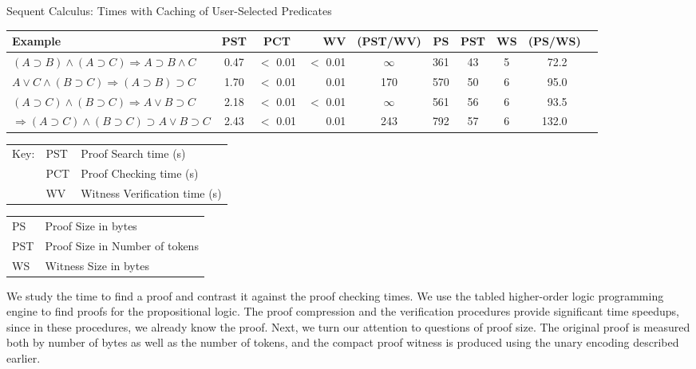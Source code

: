 \documentclass{llncs}
\begin{document}
\begin{center}
Sequent Calculus: Times with Caching of User-Selected Predicates
\begin{small}
\begin{tabular}{|l|c|c|r|c|c|c|c|c|r|}
\hline
Example & PST & PCT & WV & (PST/WV) & PS & PST & WS & (PS/WS)\\
\hline
$(A\supset B)\wedge (A\supset C)\Rightarrow A\supset B\wedge C$
&       0.47 
&     $<$ 0.01
&     $<$  0.01 
& $\infty$
&       361 
&       43 
&       5 
&       \ 72.2\\
$A\vee C\wedge (B\supset C)\Rightarrow (A\supset B)\supset C$
&       1.70 
&      $<$ 0.01
&       0.01
&       170 
&       570 
&       50 
&       6 
&       \ 95.0\\
$(A\supset C)\wedge (B\supset C)\Rightarrow A\vee B\supset C$
&       2.18 
&      $<$ 0.01
&      $<$ 0.01
&      $\infty$ 
&       561 
&       56 
&       6 
&       \ 93.5\\
$\Rightarrow (A\supset C)\wedge (B\supset C)\supset A\vee B\supset C$
&       2.43 
&      $<$ 0.01
&      \ \ 0.01
&       243 
&       792 
&       57 
&       6 
&       132.0\\
\hline
\end{tabular}
\begin{tabular}{ll@{=}l}
Key: & PST & Proof Search time (s)\\
&PCT & Proof Checking time (s)\\ 
&WV & Witness Verification time (s)
\end{tabular} 
\begin{tabular}{l@{=}l}
PS & Proof Size in bytes\\
PST & Proof Size in Number of tokens \\
WS & Witness Size in bytes\\
\end{tabular} 
\end{small}
\end{center}

We study the time to find a proof and contrast it against the proof
checking times. We use the tabled higher-order logic programming
engine \cite{Pientka05,Pientka03phd} to find proofs for the
propositional logic. The proof compression and the verification procedures
provide significant time speedups, since in these procedures, we already
know the proof. %
Next, we turn our attention to questions of proof size.
The original proof is measured both by number of bytes as well as the
number of tokens, and the compact proof witness is produced using
the unary encoding described earlier.  
\end{document}
